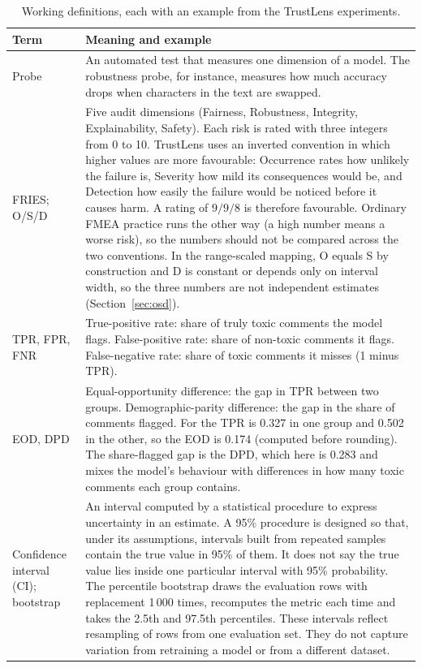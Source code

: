 \begin{table}[!htbp]
\centering\footnotesize
\caption{Working definitions, each with an example from the TrustLens experiments.}\label{tab:terms}
\begin{tabularx}{\textwidth}{|>{\raggedright\arraybackslash}p{3.1cm}|L|}
\hline
\textbf{Term} & \textbf{Meaning and example}\\
\hline
Probe & An automated test that measures one dimension of a model. The robustness probe, for instance, measures how much accuracy drops when characters in the text are swapped.\\ \hline
FRIES; O/S/D & Five audit dimensions (Fairness, Robustness, Integrity, Explainability, Safety). Each risk is rated with three integers from 0 to 10. TrustLens uses an inverted convention in which higher values are more favourable: Occurrence rates how unlikely the failure is, Severity how mild its consequences would be, and Detection how easily the failure would be noticed before it causes harm. A rating of $9/9/8$ is therefore favourable. Ordinary FMEA practice runs the other way (a high number means a worse risk), so the numbers should not be compared across the two conventions. In the range-scaled mapping, O equals S by construction and D is constant or depends only on interval width, so the three numbers are not independent estimates (Section~\ref{sec:osd}).\\ \hline
TPR, FPR, FNR & True-positive rate: share of truly toxic comments the model flags. False-positive rate: share of non-toxic comments it flags. False-negative rate: share of toxic comments it misses (1 minus TPR).\\ \hline
EOD, DPD & Equal-opportunity difference: the gap in TPR between two groups. Demographic-parity difference: the gap in the share of comments flagged. For  the TPR is 0.327 in one group and 0.502 in the other, so the EOD is 0.174 (computed before rounding). The share-flagged gap is the DPD, which here is 0.283 and mixes the model's behaviour with differences in how many toxic comments each group contains.\\ \hline
Confidence interval (CI); bootstrap & An interval computed by a statistical procedure to express uncertainty in an estimate. A 95\% procedure is designed so that, under its assumptions, intervals built from repeated samples contain the true value in 95\% of them. It does not say the true value lies inside one particular interval with 95\% probability. The percentile bootstrap draws the evaluation rows with replacement 1\,000 times, recomputes the metric each time and takes the 2.5th and 97.5th percentiles. These intervals reflect resampling of rows from one evaluation set. They do not capture variation from retraining a model or from a different dataset.\\ \hline

\end{tabularx}
\end{table}
